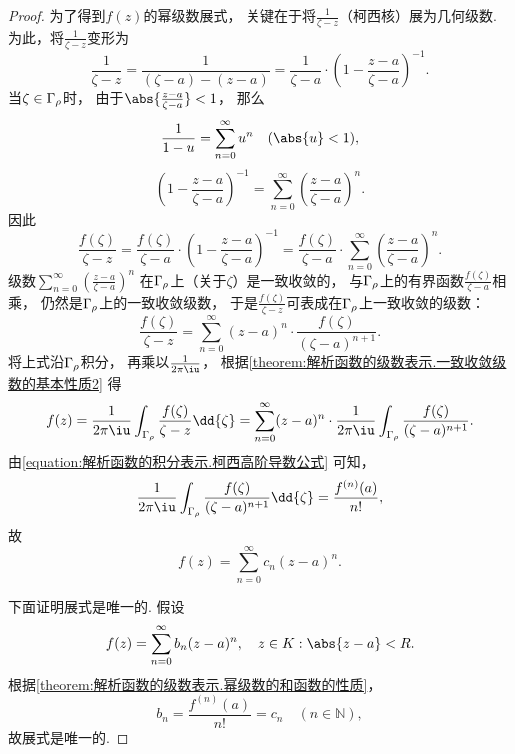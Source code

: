\begin{theorem}
\begin{proof}
为了得到\(f(z)\)的幂级数展式，
关键在于将\(\frac1{\zeta-z}\)（柯西核）展为几何级数.
为此，将\(\frac1{\zeta-z}\)变形为\begin{equation*}
	\frac1{\zeta-z}
	= \frac1{(\zeta-a)-(z-a)}
	= \frac1{\zeta-a} \cdot \left(1 - \frac{z-a}{\zeta-a}\right)^{-1}.
\end{equation*}
当\(\zeta \in \Gamma_\rho\)时，
由于\(\abs{\frac{z-a}{\zeta-a}}<1\)，
那么\begin{equation*}
	\frac1{1-u} = \sum_{n=0}^\infty u^n
	\quad(\abs{u}<1),
\end{equation*}\begin{equation*}
	\left(1 - \frac{z-a}{\zeta-a}\right)^{-1}
	= \sum_{n=0}^\infty \left(\frac{z-a}{\zeta-a}\right)^n.
\end{equation*}
因此\begin{equation*}
	\frac{f(\zeta)}{\zeta-z}
	= \frac{f(\zeta)}{\zeta-a} \cdot \left(1 - \frac{z-a}{\zeta-a}\right)^{-1}
	= \frac{f(\zeta)}{\zeta-a} \cdot \sum_{n=0}^\infty \left(\frac{z-a}{\zeta-a}\right)^n.
\end{equation*}
级数\(\sum_{n=0}^\infty \left(\frac{z-a}{\zeta-a}\right)^n\)
在\(\Gamma_\rho\)上（关于\(\zeta\)）是一致收敛的，
与\(\Gamma_\rho\)上的有界函数\(\frac{f(\zeta)}{\zeta-a}\)相乘，
仍然是\(\Gamma_\rho\)上的一致收敛级数，
于是\(\frac{f(\zeta)}{\zeta-z}\)可表成在\(\Gamma_\rho\)上一致收敛的级数：\begin{equation*}
	\frac{f(\zeta)}{\zeta-z}
	= \sum_{n=0}^\infty (z-a)^n \cdot \frac{f(\zeta)}{(\zeta-a)^{n+1}}.
\end{equation*}
将上式沿\(\Gamma_\rho\)积分，
再乘以\(\frac1{2\pi\iu}\)，
根据\cref{theorem:解析函数的级数表示.一致收敛级数的基本性质2} 得\begin{equation*}
	f(z) = \frac1{2\pi\iu} \int_{\G} \frac{f(\zeta)}{\zeta-z} \dd{\zeta}
	= \sum_{n=0}^\infty (z-a)^n \cdot \frac1{2\pi\iu} \int_{\G} \frac{f(\zeta)}{(\zeta-a)^{n+1}}.
\end{equation*}
由\cref{equation:解析函数的积分表示.柯西高阶导数公式} 可知，\begin{equation*}
	\frac1{2\pi\iu} \int_{\G} \frac{f(\zeta)}{(\zeta-a)^{n+1}} \dd{\zeta}
	= \frac{f^{(n)}(a)}{n!},
\end{equation*}
故\begin{equation*}
	f(z) = \sum_{n=0}^\infty c_n (z-a)^n.
\end{equation*}

下面证明展式是唯一的.
假设\begin{equation*}
	f(z) = \sum_{n=0}^\infty b_n (z-a)^n,
	\quad z \in K: \abs{z-a}<R.
\end{equation*}
根据\cref{theorem:解析函数的级数表示.幂级数的和函数的性质}，\begin{equation*}
	b_n = \frac{f^{(n)}(a)}{n!} = c_n \quad (n\in\mathbb{N}),
\end{equation*}
故展式是唯一的.
\end{proof}
\end{theorem}
